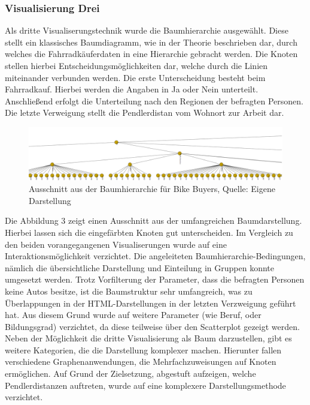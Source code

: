 \documentclass[usegeometry=true]{scrartcl}
\begin{document}
\subsubsection{Visualisierung Drei}
Als dritte Visualiserungstechnik wurde die Baumhierarchie ausgewählt. Diese stellt ein klassisches Baumdiagramm, wie in der Theorie beschrieben dar, durch welches die Fahrradkäuferdaten in eine Hierarchie gebracht werden. Die Knoten stellen hierbei Entscheidungsmöglichkeiten dar, welche durch die Linien miteinander verbunden werden. Die erste Unterscheidung besteht beim Fahrradkauf. Hierbei werden die Angaben in Ja oder Nein unterteilt. Anschließend erfolgt die Unterteilung nach den Regionen der befragten Personen. Die letzte Verweigung stellt die Pendlerdistan vom Wohnort zur Arbeit dar. 
\begin{figure}[h]
\begin{center}
\includegraphics[width=16cm]{Bilder/Baumhierarchie.png}
\caption{Ausschnitt aus der Baumhierarchie für Bike Buyers, Quelle: Eigene Darstellung}
\end{center}
\end{figure}
\newline
Die Abbildung 3 zeigt einen Ausschnitt aus der umfangreichen Baumdarstellung. Hierbei lassen sich die eingefärbten Knoten gut unterscheiden. Im Vergleich zu den beiden vorangegangenen Visualiserungen wurde auf eine Interaktionsmöglichkeit verzichtet. Die angeleiteten Baumhierarchie-Bedingungen, nämlich die übersichtliche Darstellung und Einteilung in Gruppen konnte umgesetzt werden. Trotz Vorfilterung der Parameter, dass die befragten Personen keine Autos besitze, ist die Baumstruktur sehr umfangreich, was zu Überlappungen in der HTML-Darstellungen in der letzten Verzweigung geführt hat. Aus diesem Grund wurde auf weitere Parameter (wie Beruf, oder Bildungsgrad) verzichtet, da diese teilweise über den Scatterplot gezeigt werden. Neben der Möglichkeit die dritte Visualisierung als Baum darzustellen, gibt es weitere Kategorien, die die Darstellung komplexer machen. Hierunter fallen verschiedene Graphenanwendungen, die Mehrfachzuweisungen auf Knoten ermöglichen. Auf Grund der Zielsetzung, abgestuft aufzeigen, welche Pendlerdistanzen auftreten, wurde auf eine komplexere Darstellungsmethode verzichtet. 
\end{document}
